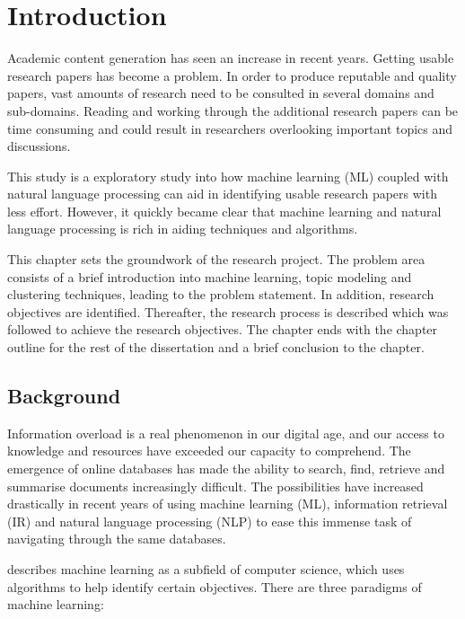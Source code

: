 \chapter{Introduction}
\label{chap: Chapter 1}

Academic content generation has seen an increase in recent years. Getting usable research papers has become a problem. In order to produce reputable and quality papers, vast amounts of research need to be consulted in several domains and sub-domains. Reading and working through the additional research papers can be time consuming and could result in researchers overlooking important topics and discussions.

This study is a exploratory study into how machine learning (ML) coupled with natural language processing can aid in identifying usable research papers with less effort. However, it quickly became clear that machine learning and natural language processing is rich in aiding techniques and algorithms.

This chapter sets the groundwork of the research project. The problem area consists of a brief introduction into machine learning, topic modeling and clustering techniques, leading to the problem statement. In addition, research objectives are identified. Thereafter, the research process is described which was followed to achieve the research objectives. The chapter ends with the chapter outline for the rest of the dissertation and a brief conclusion to the chapter.


\section{Background}

Information overload is a real phenomenon in our digital age, and our access to knowledge and resources have exceeded our capacity to comprehend. The emergence of online databases has made the ability to search, find, retrieve and summarise documents increasingly difficult. The possibilities have increased drastically in recent years of using machine learning (ML), information retrieval (IR) and natural language processing (NLP) to ease this immense task of navigating through the same databases.

 describes machine learning as a subfield of computer science, which uses algorithms to help identify certain objectives. There are three paradigms of machine learning:

